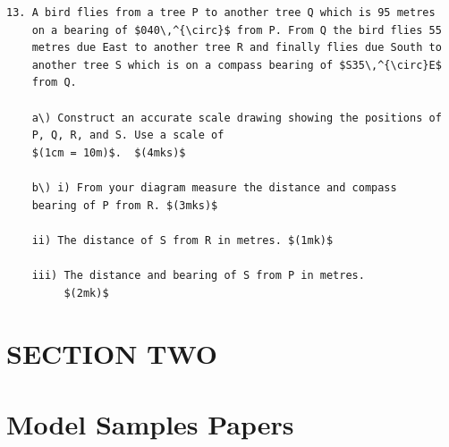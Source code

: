 \documentclass[
  a4paperpaper,
]{scrbook}
\begin{document}
\begin{tcolorbox}
\begin{verbatim}
13. A bird flies from a tree P to another tree Q which is 95 metres
    on a bearing of $040\,^{\circ}$ from P. From Q the bird flies 55
    metres due East to another tree R and finally flies due South to
    another tree S which is on a compass bearing of $S35\,^{\circ}E$
    from Q.

    a\) Construct an accurate scale drawing showing the positions of
    P, Q, R, and S. Use a scale of
    $(1cm = 10m)$.  $(4mks)$

    b\) i) From your diagram measure the distance and compass
    bearing of P from R. $(3mks)$

    ii) The distance of S from R in metres. $(1mk)$

    iii) The distance and bearing of S from P in metres.
         $(2mk)$
\end{verbatim}

\end{tcolorbox}


\chapter*{SECTION TWO}\label{section-two}



\chapter*{Model Samples Papers}\label{model-samples-papers}

\end{document}
